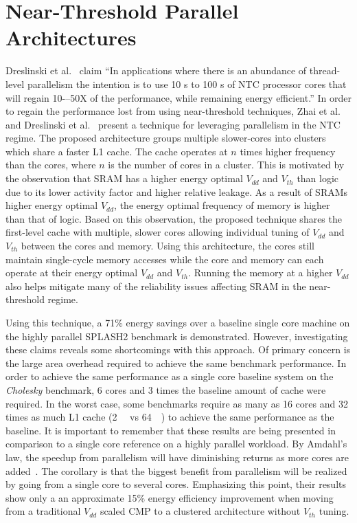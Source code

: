 \section{Near-Threshold Parallel Architectures} \label{sec:clustering}

Dreslinski et al.~\cite{dreslinski2010near} claim ``In applications where there
is an abundance of thread-level parallelism the intention is to use 10 s to 100
s of NTC processor cores that will regain 10-–50X of the performance, while
remaining energy efficient.'' In order to regain the performance lost from using
near-threshold techniques, Zhai et al.~\cite{Zhai:2007kn} and Dreslinski et
al.~\cite{Dreslinski:2007id} present a technique for leveraging parallelism in
the NTC regime. The proposed architecture groups multiple slower-cores into
clusters which share a faster L1 cache. The cache operates at $n$ times higher
frequency than the cores, where $n$ is the number of cores in a cluster. This is
motivated by the observation that SRAM has a higher energy optimal $V_{dd}$ and
$V_{th}$ than logic due to its lower activity factor and higher relative
leakage.  As a result of SRAMs higher energy optimal $V_{dd}$, the energy
optimal frequency of memory is higher than that of logic.  Based on this
observation, the proposed technique shares the first-level cache with multiple,
slower cores allowing individual tuning of $V_{dd}$ and $V_{th}$ between the
cores and memory. Using this architecture, the cores still maintain single-cycle
memory accesses while the core and memory can each operate at their energy
optimal $V_{dd}$ and $V_{th}$. Running the memory at a higher $V_{dd}$ also
helps mitigate many of the reliability issues affecting SRAM in the
near-threshold regime.

Using this technique, a 71\% energy savings over a baseline single core machine
on the highly parallel SPLASH2 benchmark is demonstrated. However, investigating
these claims reveals some shortcomings with this approach.  Of primary concern
is the large area overhead required to achieve the same benchmark performance.
In order to achieve the same performance as a single core baseline system on the
\emph{Cholesky} benchmark, 6 cores and 3 times the baseline amount of cache were
required.  In the worst case, some benchmarks require as many as 16 cores and 32
times as much L1 cache (\SI{2}{\mega\byte} vs \SI{64}{\kilo\byte}) to achieve
the same performance as the baseline.  It is important to remember that these
results are being presented in comparison to a single core reference on a highly
parallel workload. By Amdahl's law, the speedup from parallelism will have
diminishing returns as more cores are added~\cite{Amdahl:1967eu}.  The corollary is that the biggest
benefit from parallelism will be realized by going from a single core to several
cores. Emphasizing this point, their results show only a an approximate 15\%
energy efficiency improvement when moving from a traditional $V_{dd}$ scaled CMP
to a clustered architecture without $V_{th}$ tuning.

